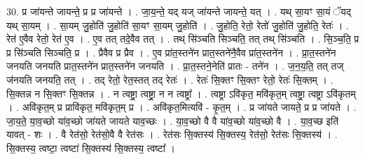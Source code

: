 \documentclass[17pt]{extarticle}
\begin{document}
30. प्र जा॑यन्ते जायन्ते॒ प्र प्र जा॑यन्ते । . जा॒य॒न्ते॒ यद् यज् जा॑यन्ते जायन्ते॒ यत् । . यथ् सा॒यꣳ सा॒यं ॅयद् यथ् सा॒यम् । . सा॒यम् जु॒होति॑ जु॒होति॑ सा॒यꣳ सा॒यम् जु॒होति॑ । . जु॒होति॒ रेतो॒ रेतो॑ जु॒होति॑ जु॒होति॒ रेतः॑ । . रेत॑ ए॒वैव रेतो॒ रेत॑ ए॒व । . ए॒व तत् तदे॒वैव तत् । . तथ् सि॑ञ्चति सिञ्चति॒ तत् तथ् सि॑ञ्चति । . सि॒ञ्च॒ति॒ प्र प्र सि॑ञ्चति सिञ्चति॒ प्र । . प्रैवैव प्र प्रैव । . ए॒व प्रा॑त॒स्तने॑न प्रात॒स्तने॑नै॒वैव प्रा॑त॒स्तने॑न । . प्रा॒त॒स्तने॑न जनयति जनयति प्रात॒स्तने॑न प्रात॒स्तने॑न जनयति । . प्रा॒त॒स्तने॒नेति॑ प्रातः - तने॑न । . ज॒न॒य॒ति॒ तत् तज् ज॑नयति जनयति॒ तत् । . तद् रेतो॒ रेत॒स्तत् तद् रेतः॑ । . रेतः॑ सि॒क्तꣳ सि॒क्तꣳ रेतो॒ रेतः॑ सि॒क्तम् । . सि॒क्तन्न न सि॒क्तꣳ सि॒क्तन्न । . न त्वष्ट्रा॒ त्वष्ट्रा॒ न न त्वष्ट्रा᳚ । . त्वष्ट्रा ऽवि॑कृत॒ मवि॑कृत॒म् त्वष्ट्रा॒ त्वष्ट्रा ऽवि॑कृतम् । . अवि॑कृत॒म् प्र प्रावि॑कृत॒ मवि॑कृत॒म् प्र । . अवि॑कृत॒मित्यवि॑ - कृ॒त॒म् । . प्र जा॑यते जायते॒ प्र प्र जा॑यते । . जा॒य॒ते॒ या॒व॒च्छो या॑व॒च्छो जा॑यते जायते याव॒च्छः । . या॒व॒च्छो वै वै या॑व॒च्छो या॑व॒च्छो वै । . या॒व॒च्छ इति॑ यावत् - शः । . वै रेत॑सो॒ रेत॑सो॒वै वै रेत॑सः । . रेत॑सः सि॒क्तस्य॑ सि॒क्तस्य॒ रेत॑सो॒ रेत॑सः सि॒क्तस्य॑ । . सि॒क्तस्य॒ त्वष्टा॒ त्वष्टा॑ सि॒क्तस्य॑ सि॒क्तस्य॒ त्वष्टा᳚ । \newline
\end{document}
